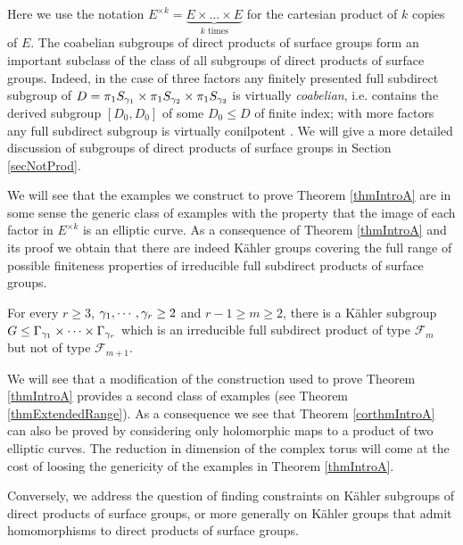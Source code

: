 Here we use the notation $E^{\times k}=\underbrace{E\times \dots \times E}_{\mbox{$k$ times}}$ for the cartesian product of $k$ copies of $E$. The coabelian subgroups of direct products of surface groups form an important subclass of the class of all subgroups of direct products of surface groups. Indeed, in the case of three factors any finitely presented full subdirect subgroup of $D=\pi_1 S_{\gamma_1}\times \pi_1 S_{\gamma_2}\times \pi_1 S_{\gamma_3}$ is virtually \textit{coabelian}, i.e. contains the derived subgroup $\left[D_0,D_0\right]$ of some $D_0\leq D$ of finite index; with more factors any full subdirect subgroup is virtually conilpotent \cite{BriHowMilSho-13}. We will give a more detailed discussion of subgroups of direct products of surface groups in Section \ref{secNotProd}. 
 
We will see that the examples we construct to prove Theorem \ref{thmIntroA} are in some sense the generic class of examples with the property that the image of each factor in $E^{\times k}$ is an elliptic curve. As a consequence of Theorem \ref{thmIntroA} and its proof we obtain that there are indeed K\"ahler groups covering the full range of possible finiteness properties of irreducible full subdirect products of surface groups.
 
 \begin{theorem}
  For every $r \geq 3$, $\gamma_1,\cdots,\gamma_r\geq 2$ and $r-1\geq m\geq 2$, there is a K\"ahler subgroup $G\leq \Gamma_{\gamma_1}\times \cdots \times \Gamma_{\gamma_r}$ which is an irreducible full subdirect product of type $\mathcal{F}_m$ but not of type $\mathcal{F}_{m+1}$.
  \label{corthmIntroA}
 \end{theorem}

We will see that a modification of the construction used to prove Theorem \ref{thmIntroA} provides a second class of examples (see Theorem \ref{thmExtendedRange}). As a consequence we see that Theorem \ref{corthmIntroA} can also be proved by considering only holomorphic maps to a product of two elliptic curves. The reduction in dimension of the complex torus will come at the cost of loosing the genericity of the examples in Theorem \ref{thmIntroA}.

Conversely, we address the question of finding constraints on K\"ahler subgroups of direct products of surface groups, or more generally on K\"ahler groups that admit homomorphisms to direct products of surface groups. 

